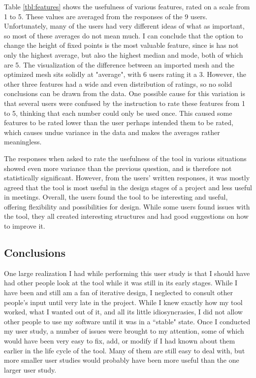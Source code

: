 \documentclass{thesis}
\begin{document}
Table \ref{tbl:features} shows the usefulness of various features, rated on a scale from 1 to 5.  These values are averaged from
the responses of the 9 users.  Unfortunately, many of the users had very different ideas of what as important, so most of these
averages do not mean much.  I can conclude that the option to change the height of fixed points is the most valuable feature,
since is has not only the highest average, but also the highest median and mode, both of which are 5.  The visualization of the
difference between an imported mesh and the optimized mesh sits solidly at "average", with 6 users rating it a 3.  However, the
other three features had a wide and even distribution of ratings, so no solid conclusions can be drawn from the data.  One
possible cause for this variation is that several users were confused by the instruction to rate these features from 1 to 5,
thinking that each number could only be used once.  This caused some features to be rated lower than the user perhaps intended
them to be rated, which causes undue variance in the data and makes the averages rather meaningless.

The responses when asked to rate the usefulness of the tool in various situations showed even more variance than the previous
question, and is therefore not statistically significant.  However, from the users' written responses, it was mostly agreed
that the tool is most useful in the design stages of a project and less useful in meetings.  Overall, the users found the tool
to be interesting and useful, offering flexibility and possibilities for design.  While some users found issues with the tool,
they all created interesting structures and had good suggestions on how to improve it.

\subsection{Conclusions}
One large realization I had while performing this user study is that I should have had other people look at the tool while it
was still in its early stages.  While I have been and still am a fan of iterative design, I neglected to consult other people's
input until very late in the project.  While I knew exactly how my tool worked, what I wanted out of it, and all its little
idiosyncrasies, I did not allow other people to use my software until it was in a ``stable" state.  Once I conducted my user study,
a number of issues were brought to my attention, some of which would have been very easy to fix, add, or modify if I had known
about them earlier in the life cycle of the tool.  Many of them are still easy to deal with, but more smaller user studies
would probably have been more useful than the one larger user study.
\end{document}
